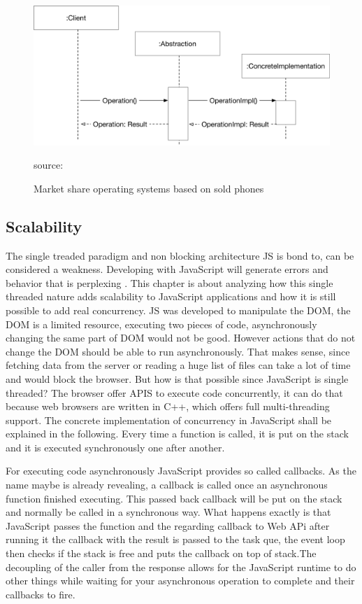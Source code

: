 \begin{figure}[hb]
	\centering
	\includegraphics[scale=0.6]{bilder/grundlagen/BridgePattern.png}
	\caption{Market share operating systems based on sold phones} source:\cite{JS}
	\label{fig:MS}
\end{figure}


\subsection{Scalability}
The single treaded paradigm and non blocking architecture \gls{JS}  is bond to, can be considered a weakness. Developing with JavaScript will generate errors and behavior that is perplexing . This chapter is about analyzing how this single threaded nature adds scalability to JavaScript applications and how it is still possible to add real concurrency. \gls{JS} was developed to manipulate the DOM, the DOM is a limited resource, executing two pieces of code, asynchronously changing the same part of DOM would not be good. However actions that do not change the DOM should be able to run asynchronously. That makes sense, since fetching data from the server or reading a huge list of files can take a lot of time and would block the browser. But how is that possible since JavaScript is single threaded? The browser offer APIS to execute code concurrently, it can do that because web browsers are written in C++, which offers full multi-threading support. The concrete implementation of concurrency in JavaScript shall be explained in the following. Every time a function is called, it is put on the stack and it is executed synchronously one after another.






 For executing code asynchronously JavaScript provides so called callbacks. As the name maybe is already revealing, a callback is called once an asynchronous function finished executing. This passed back callback will be put on the stack and normally be called in a synchronous way. What happens exactly is that JavaScript passes the function and the regarding callback to Web APi after running it the callback with the result  is passed to the task que, the event loop then checks if the stack is free and puts the callback on top of stack.The decoupling of the caller from the response allows for the JavaScript runtime to do other things while waiting for your asynchronous operation to complete and their callbacks to fire.








